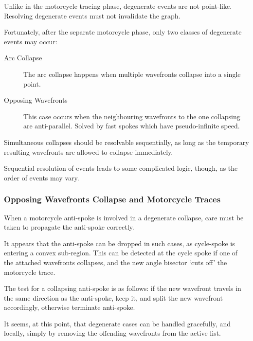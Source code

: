 \documentclass[12pt,a4paper,oneside,openany]{article}
\begin{document}
Unlike in the motorcycle tracing phase, degenerate events are not point-like. Resolving degenerate events must not invalidate the graph.

Fortunately, after the separate motorcycle phase, only two classes of degenerate events may occur:
\begin{description}
\item[Arc Collapse] The arc collapse happens when multiple wavefronts collapse into a single point. 
\item[Opposing Wavefronts] This case occurs when the neighbouring wavefronts to the one collapsing are anti-parallel. Solved by fast spokes which have pseudo-infinite speed.
\end{description}

Simultaneous collapses should be resolvable sequentially, as long as the temporary resulting wavefronts are allowed to collapse immediately.

Sequential resolution of events leads to some complicated logic, though, as the order of events may vary.

\subsubsection{Opposing Wavefronts Collapse and Motorcycle Traces}

When a motorcycle anti-spoke is involved in a degenerate collapse, care must be taken to propagate the anti-spoke correctly.

It appears that the anti-spoke can be dropped in such cases, as cycle-spoke is entering a convex sub-region. This can be detected at the cycle spoke if one of the attached wavefronts collapses, and the new angle bisector `cuts off' the motorcycle trace.

The test for a collapsing anti-spoke is as follows: if the new wavefront travels in the same direction as the anti-spoke, keep it, and split the new wavefront accordingly, otherwise terminate anti-spoke. 

It seems, at this point, that degenerate cases can be handled gracefully, and locally, simply by removing the offending wavefronts from the active list.

%
%
\end{document}
